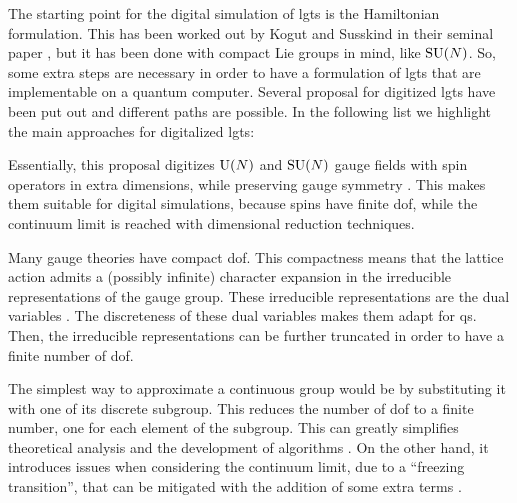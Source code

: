 The starting point for the digital simulation of \acp{lgt} is the Hamiltonian formulation.
This has been worked out by Kogut and Susskind in their seminal paper \cite{kogut1975hamiltonian}, but it has been done with compact Lie groups in mind, like $\text{SU}(N)$.
So, some extra steps are necessary in order to have a formulation of \acp{lgt} that are implementable on a quantum computer.
Several proposal for digitized \acp{lgt} have been put out
\cite{zohar2015latticegauge, zohar2017digital, zohar2017z2gauge, milstead2018qyangmills, bender2018lgt3d, cui2020circuit, byrnes2006lgt, chandrasekharan1997linkmodels, hackett2019lgt, lamm2019lgt}
and different paths are possible.
In the following list we highlight the main approaches for digitalized \acp{lgt}:
\begin{description}[labelsep=1.1em]
    \item[Quantum Link Models]
        Essentially, this proposal digitizes $\mathrm{U}(N)$ and $\text{SU}(N)$ gauge fields with spin operators in extra dimensions, while preserving gauge symmetry \cite{chandrasekharan1997linkmodels, brower1999linkmodel}.
        This makes them suitable for digital simulations, because spins have finite \ac{dof}, while the continuum limit is reached with dimensional reduction techniques.

    \item[Dual variables]
        Many gauge theories have compact \ac{dof}.
        This compactness means that the lattice action admits a (possibly infinite) character expansion in the irreducible representations of the gauge group.
        These irreducible representations are the dual variables \cite{savit1980duality, kaplan2020lgt}.
        The discreteness of these dual variables makes them adapt for \ac{qs}.
        Then, the irreducible representations can be further truncated in order to have a finite number of \ac{dof}.

    \item[Finite subgroups]
        The simplest way to approximate a continuous group would be by substituting it with one of its discrete subgroup.
        This reduces the number of \ac{dof} to a finite number, one for each element of the subgroup.
        This can greatly simplifies theoretical analysis \cite{fradkin1979phase} and the development of algorithms \cite{lamm2019lgt}.
        On the other hand, it introduces issues when considering the continuum limit, due to a ``freezing transition'', that can be mitigated with the addition of some extra terms \cite{ji2020digitization, lamm2019gluon}.

\end{description}

